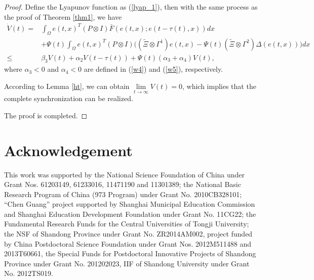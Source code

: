 \documentclass[review]{elsarticle}
\begin{document}
\begin{proof}
Define the Lyapunov function as (\ref{lyap_1}), then with the same process as the proof of Theorem \ref{thm1}, we have
\begin{align*}
\dot{V}(t)=&\int_{\Omega}e(t,x)^T(P\otimes I)\bar{F}(e(t,x);e(t-\tau(t),x))dx\\
&+\Psi(t)\int_{\Omega}e(t,x)^T(P\otimes I)\bigg((\tilde{\Xi}\otimes\Gamma^1)
e(t,x)-\Psi(t)(\tilde{\Xi}\otimes\Gamma^2)
\Delta(e(t,x))\bigg)dx\\
\leq &\beta_3V(t)+\alpha_2V(t-\tau(t))+\Psi(t)(\alpha_3+\alpha_4)V(t),
\end{align*}
where $\alpha_3<0$ and $\alpha_4<0$ are defined in (\ref{w4}) and (\ref{w5}), respectively.

According to Lemma \ref{ht}, we can obtain $\lim\limits_{t\rightarrow\infty}V(t)=0$, which implies that the complete synchronization can be realized.

The proof is completed.
\end{proof}
\section*{Acknowledgement}
This work was supported by the National Science Foundation of China under Grant Nos. 61203149, 61233016, 11471190 and 11301389;
the National Basic Research Program of China (973 Program) under Grant No. 2010CB328101; ``Chen Guang'' project supported by Shanghai Municipal Education Commission and Shanghai Education Development Foundation under Grant No. 11CG22; the Fundamental Research Funds for the Central Universities of Tongji University; the NSF of Shandong Province under Grant No. ZR2014AM002, project funded by China Postdoctoral Science Foundation under Grant Nos. 2012M511488 and 2013T60661, the Special Funds for Postdoctoral Innovative Projects of Shandong Province under Grant No. 201202023, IIF of Shandong University under Grant No. 2012TS019.
\end{document}
